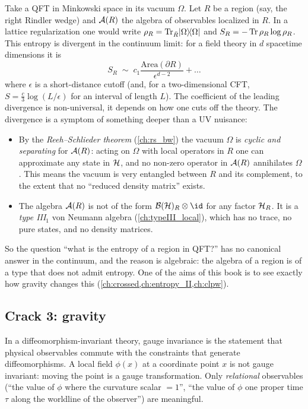 Take a QFT in Minkowski space in its vacuum $\Omega$. Let $R$ be a region (say, the right Rindler wedge) and $\mathcal{A}(R)$ the algebra of observables localized in $R$. In a lattice regularization one would write $\rho_R=\operatorname{Tr}_{\bar R}\lvert \Omega\rangle\!\langle \Omega\rvert$ and $S_R=-\operatorname{Tr}\rho_R\log\rho_R$. This entropy is divergent in the continuum limit: for a field theory in $d$ spacetime dimensions it is
\begin{equation}
S_R\;\sim\;c_1\frac{\mathrm{Area}(\partial R)}{\epsilon^{d-2}}+\dots
\end{equation}
where $\epsilon$ is a short-distance cutoff (and, for a two-dimensional CFT, $S=\tfrac{c}{3}\log(L/\epsilon)$ for an interval of length $L$). The coefficient of the leading divergence is non-universal, it depends on how one cuts off the theory. The divergence is a symptom of something deeper than a UV nuisance:

\begin{itemize}
\item By the \emph{Reeh--Schlieder theorem} (\cref{ch:rs_bw}) the vacuum $\Omega$ is \emph{cyclic and separating} for $\mathcal{A}(R)$: acting on $\Omega$ with local operators in $R$ one can approximate any state in $\mathcal{H}$, and no non-zero operator in $\mathcal{A}(R)$ annihilates $\Omega$. This means the vacuum is very entangled between $R$ and its complement, to the extent that no ``reduced density matrix'' exists.
\item The algebra $\mathcal{A}(R)$ is not of the form $\BH_R\otimes\id$ for any factor $\mathcal{H}_R$. It is a \emph{type III$_1$} von Neumann algebra (\cref{ch:typeIII_local}), which has no trace, no pure states, and no density matrices.
\end{itemize}

So the question ``what is the entropy of a region in QFT?'' has no canonical answer in the continuum, and the reason is algebraic: the algebra of a region is of a type that does not admit entropy. One of the aims of this book is to see exactly how gravity changes this (\cref{ch:crossed,ch:entropy_II,ch:clpw}).

\subsection{Crack 3: gravity}

In a diffeomorphism-invariant theory, gauge invariance is the statement that physical observables commute with the constraints that generate diffeomorphisms. A local field $\phi(x)$ at a coordinate point $x$ is not gauge invariant: moving the point is a gauge transformation. Only \emph{relational} observables (``the value of $\phi$ where the curvature scalar $=1$'', ``the value of $\phi$ one proper time $\tau$ along the worldline of the observer'') are meaningful.


